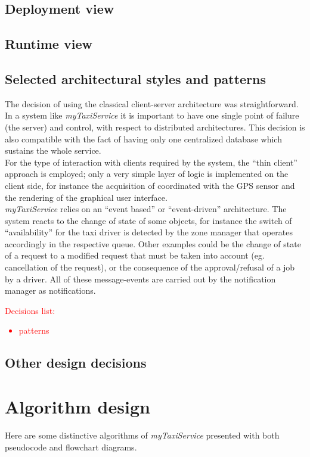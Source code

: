 \documentclass[a4paper,11pt]{report} %
\newcommand{\mts}{\mbox{\normalfont\itshape myTaxiService}}
\begin{document}
	
	\subsection{Deployment view}
	
	\subsection{Runtime view}
	
	\subsection{Selected architectural styles and patterns}

	The decision of using the classical client-server architecture was straightforward. In a system like \mts{} it is important to have one single point of failure (the server) and control, with respect to distributed architectures. This decision is also compatible with the fact of having only one centralized database which sustains the whole service.\\
	For the type of interaction with clients required by the system, the ``thin client'' approach is employed; only a very simple layer of logic is implemented on the client side, for instance the acquisition of coordinated with the GPS sensor and the rendering of the graphical user interface.\\
	\mts{} relies on an ``event based'' or ``event-driven'' architecture. The system reacts to the change of state of some objects, for instance the switch of ``availability'' for the taxi driver is detected by the zone manager that operates accordingly in the respective queue. Other examples could be the change of state of a request to a modified request that must be taken into account (eg. cancellation of the request), or the consequence of the approval/refusal of a job by a driver. All of these message-events are carried out by the notification manager as notifications.\\
	\textcolor{red}{Decisions list:\begin{itemize}
			\item patterns
		\end{itemize}}	
	
	\subsection{Other design decisions}

	\section{Algorithm design}
	Here are some distinctive algorithms of \mts{} presented with both pseudocode and flowchart diagrams.
\end{document}
